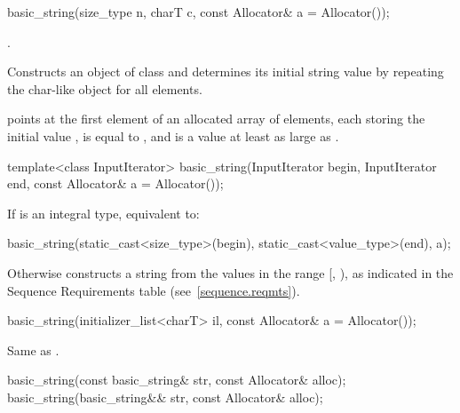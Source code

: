 %
\begin{itemdecl}
basic_string(size_type n, charT c, const Allocator& a = Allocator());
\end{itemdecl}

\begin{itemdescr}
\pnum
\requires
{}.

\pnum
\effects
Constructs an object of class 
and determines its initial string value by repeating the char-like
object  for all  elements.

\pnum
\postconditions
{} points at the first element of an allocated array
of  elements, each storing the initial value ,
 is equal to , and
 is a value at least as large as .
\end{itemdescr}

%
\begin{itemdecl}
template<class InputIterator>
  basic_string(InputIterator begin, InputIterator end, const Allocator& a = Allocator());
\end{itemdecl}

\begin{itemdescr}
\pnum
\effects
If  is an integral type,
equivalent to:
\begin{codeblock}
basic_string(static_cast<size_type>(begin), static_cast<value_type>(end), a);
\end{codeblock}
Otherwise constructs a string from the values in the range [, ),
as indicated in the Sequence Requirements table
(see~\ref{sequence.reqmts}).
%
\end{itemdescr}

%
\begin{itemdecl}
basic_string(initializer_list<charT> il, const Allocator& a = Allocator());
\end{itemdecl}

\begin{itemdescr}
\pnum
\effects Same as .
\end{itemdescr}

%
\begin{itemdecl}
basic_string(const basic_string& str, const Allocator& alloc);
basic_string(basic_string&& str, const Allocator& alloc);
\end{itemdecl}

